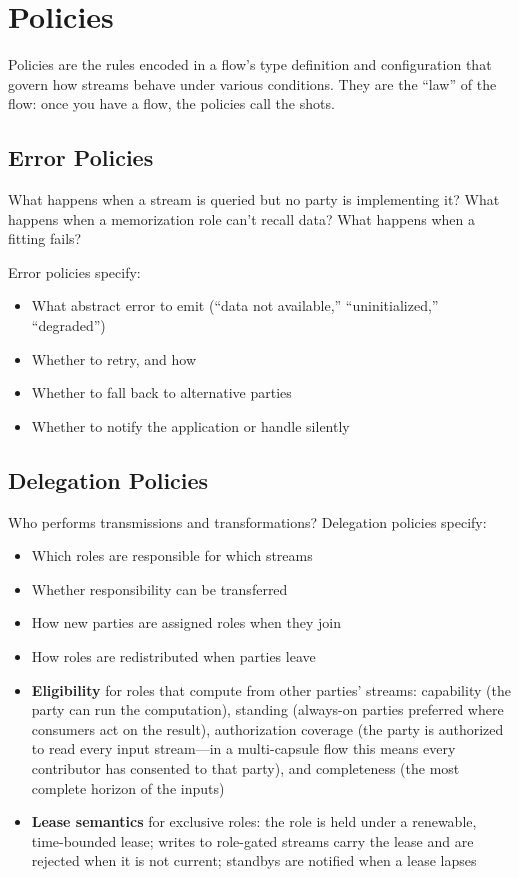 \documentclass[11pt, letterpaper]{article}
\begin{document}
\newpage
\section{Policies}
\label{sec:policies}

Policies are the rules encoded in a flow's type definition and configuration that
govern how streams behave under various conditions. They are the ``law'' of the flow:
once you have a flow, the policies call the shots.

\subsection{Error Policies}

What happens when a stream is queried but no party is implementing it? What happens
when a memorization role can't recall data? What happens when a fitting fails?

Error policies specify:
\begin{itemize}[leftmargin=2em]
  \item What abstract error to emit (``data not available,'' ``uninitialized,''
    ``degraded'')
  \item Whether to retry, and how
  \item Whether to fall back to alternative parties
  \item Whether to notify the application or handle silently
\end{itemize}

\subsection{Delegation Policies}

Who performs transmissions and transformations? Delegation policies specify:
\begin{itemize}[leftmargin=2em]
  \item Which roles are responsible for which streams
  \item Whether responsibility can be transferred
  \item How new parties are assigned roles when they join
  \item How roles are redistributed when parties leave
  \item \textbf{Eligibility} for roles that compute from other parties' streams:
    capability (the party can run the computation), standing (always-on parties
    preferred where consumers act on the result), authorization coverage (the party is
    authorized to read every input stream---in a multi-capsule flow this means every
    contributor has consented to that party), and completeness (the most complete
    horizon of the inputs)
  \item \textbf{Lease semantics} for exclusive roles: the role is held under a
    renewable, time-bounded lease; writes to role-gated streams carry the lease and are
    rejected when it is not current; standbys are notified when a lease lapses
\end{itemize}
\end{document}
